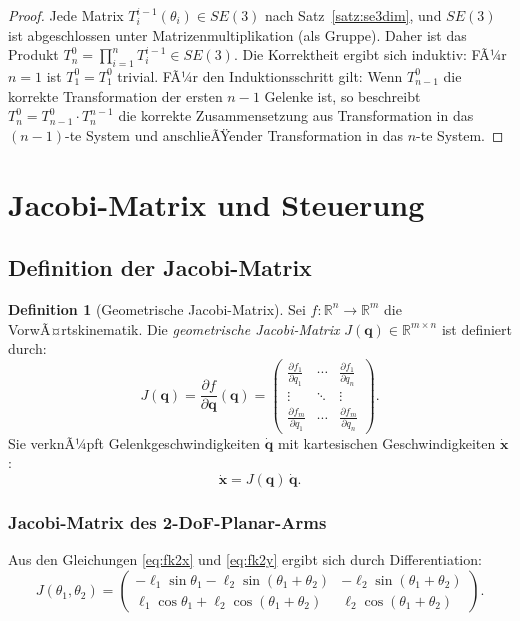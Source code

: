 ﻿\documentclass[a4paper,12pt]{article}
\theoremstyle{definition}
\newtheorem{definition}{Definition}
\begin{document}
\begin{proof}
	Jede Matrix $T_i^{i-1}(\theta_i) \in SE(3)$ nach Satz~\ref{satz:se3dim}, und $SE(3)$ ist abgeschlossen unter Matrizenmultiplikation (als Gruppe). Daher ist das Produkt $T_n^0 = \prod_{i=1}^n T_i^{i-1} \in SE(3)$. Die Korrektheit ergibt sich induktiv: FÃ¼r $n=1$ ist $T_1^0 = T_1^0$ trivial. FÃ¼r den Induktionsschritt gilt: Wenn $T_{n-1}^0$ die korrekte Transformation der ersten $n-1$ Gelenke ist, so beschreibt $T_n^0 = T_{n-1}^0 \cdot T_n^{n-1}$ die korrekte Zusammensetzung aus Transformation in das $(n-1)$-te System und anschlieÃŸender Transformation in das $n$-te System. \qedhere
\end{proof}

\section{Jacobi-Matrix und Steuerung}

\subsection{Definition der Jacobi-Matrix}

\begin{definition}[Geometrische Jacobi-Matrix]
	Sei $f: \mathbb{R}^n \to \mathbb{R}^m$ die VorwÃ¤rtskinematik. Die \emph{geometrische Jacobi-Matrix} $J(\mathbf{q}) \in \mathbb{R}^{m \times n}$ ist definiert durch:
	\[
		J(\mathbf{q}) = \frac{\partial f}{\partial \mathbf{q}}(\mathbf{q}) = \begin{pmatrix} \frac{\partial f_1}{\partial q_1} & \cdots & \frac{\partial f_1}{\partial q_n} \\ \vdots & \ddots & \vdots \\ \frac{\partial f_m}{\partial q_1} & \cdots & \frac{\partial f_m}{\partial q_n} \end{pmatrix}.
	\]
	Sie verknÃ¼pft Gelenkgeschwindigkeiten $\dot{\mathbf{q}}$ mit kartesischen Geschwindigkeiten $\dot{\mathbf{x}}$:
	\[
		\dot{\mathbf{x}} = J(\mathbf{q})\, \dot{\mathbf{q}}.
	\]
\end{definition}

\subsubsection{Jacobi-Matrix des 2-DoF-Planar-Arms}

Aus den Gleichungen \eqref{eq:fk2x} und \eqref{eq:fk2y} ergibt sich durch Differentiation:
\[
	J(\theta_1, \theta_2) = \begin{pmatrix}
		-\ell_1 \sin\theta_1 - \ell_2 \sin(\theta_1+\theta_2) & -\ell_2 \sin(\theta_1+\theta_2) \\
		 \ell_1 \cos\theta_1 + \ell_2 \cos(\theta_1+\theta_2) &  \ell_2 \cos(\theta_1+\theta_2)
	\end{pmatrix}.
\]
\end{document}
